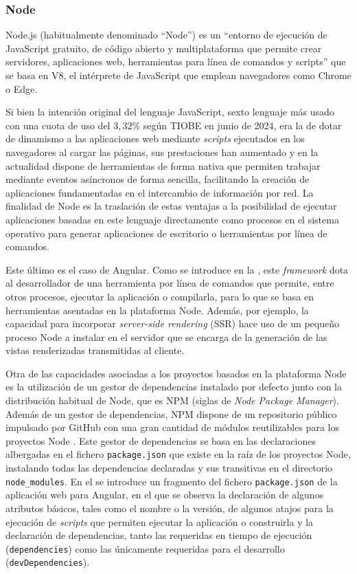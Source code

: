 \subsubsection{Node}
\label{subsec:node}
Node.js (habitualmente denominado ``Node'') es un ``entorno de ejecución de JavaScript gratuito, de código abierto y multiplataforma que permite crear servidores, aplicaciones web, herramientas para línea de comandos y scripts'' \cite{Node} que se basa en V8, el intérprete de JavaScript que emplean navegadores como Chrome o Edge.

Si bien la intención original del lenguaje JavaScript, sexto lenguaje más usado con una cuota de uso del $3,32\%$ según TIOBE \cite{TIOBE} en junio de 2024, era la de dotar de dinamismo a las aplicaciones web mediante \textit{scripts} ejecutados en los navegadores al cargar las páginas, sus prestaciones han aumentado y en la actualidad dispone de herramientas de forma nativa que permiten trabajar mediante eventos asíncronos de forma sencilla, facilitando la creación de aplicaciones fundamentadas en el intercambio de información por red. La finalidad de Node es la traslación de estas ventajas a la posibilidad de ejecutar aplicaciones basadas en este lenguaje directamente como procesos en el sistema operativo para generar aplicaciones de escritorio o herramientas por línea de comandos.

Este último es el caso de Angular. Como se introduce en la , este \textit{framework} dota al desarrollador de una herramienta por línea de comandos que permite, entre otros procesos, ejecutar la aplicación o compilarla, para lo que se basa en herramientas asentadas en la plataforma Node. Además, por ejemplo, la capacidad para incorporar \textit{server-side rendering} (SSR) hace uso de un pequeño proceso Node a instalar en el servidor que se encarga de la generación de las vistas renderizadas transmitidas al cliente.

Otra de las capacidades asociadas a los proyectos basados en la plataforma Node es la utilización de un gestor de dependencias instalado por defecto junto con la distribución habitual de Node, que es NPM (siglas de \textit{Node Package Manager}). Además de un gestor de dependencias, NPM dispone de un repositorio público impulsado por GitHub con una gran cantidad de módulos reutilizables para los proyectos Node \cite{npmjscom}. Este gestor de dependencias se basa en las declaraciones albergadas en el fichero \texttt{package.json} que existe en la raíz de los proyectos Node, instalando todas las dependencias declaradas y sus transitivas en el directorio \texttt{node\_modules}. En el  se introduce un fragmento del fichero \texttt{package.json} de la aplicación web para Angular, en el que se observa la declaración de algunos atributos básicos, tales como el nombre o la versión, de algunos atajos para la ejecución de \textit{scripts} que permiten ejecutar la aplicación o construirla y la declaración de dependencias, tanto las requeridas en tiempo de ejecución (\texttt{dependencies}) como las únicamente requeridas para el desarrollo (\texttt{devDependencies}).


